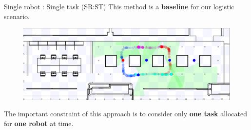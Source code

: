     \begin{frame}[fragile]{Single robot : Single task (SR:ST)}
        This method is a {\bf baseline} for our logistic scenario.

        \begin{figure}[hbt]
            \centering
            \includegraphics[width=\textwidth]{img/cycle1.png}
        \end{figure}
        The important constraint of this approach is to consider only {\bf one task} allocated for 
{\bf one robot} at time.
    \end{frame}

